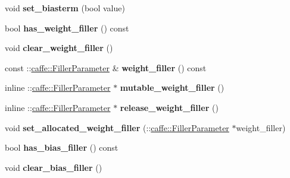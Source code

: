 \begin{DoxyCompactItemize}
void {\bfseries set\+\_\+biasterm} (bool value)
\item 
\mbox{\label{classcaffe_1_1_v0_layer_parameter_a8ea00d416e5208f8674954ca24645034}} 
bool {\bfseries has\+\_\+weight\+\_\+filler} () const
\item 
\mbox{\label{classcaffe_1_1_v0_layer_parameter_a70b689cbd8049c4d2cd89a0199e9e92b}} 
void {\bfseries clear\+\_\+weight\+\_\+filler} ()
\item 
\mbox{\label{classcaffe_1_1_v0_layer_parameter_aabc6c69238770f1ba8301add36dacda4}} 
const \+::\mbox{\hyperlink{classcaffe_1_1_filler_parameter}{caffe\+::\+Filler\+Parameter}} \& {\bfseries weight\+\_\+filler} () const
\item 
\mbox{\label{classcaffe_1_1_v0_layer_parameter_a27973929c368ae51d74019d537db47e3}} 
inline \+::\mbox{\hyperlink{classcaffe_1_1_filler_parameter}{caffe\+::\+Filler\+Parameter}} $\ast$ {\bfseries mutable\+\_\+weight\+\_\+filler} ()
\item 
\mbox{\label{classcaffe_1_1_v0_layer_parameter_a0683811531aac9a905cf8968b5aa9b81}} 
inline \+::\mbox{\hyperlink{classcaffe_1_1_filler_parameter}{caffe\+::\+Filler\+Parameter}} $\ast$ {\bfseries release\+\_\+weight\+\_\+filler} ()
\item 
\mbox{\label{classcaffe_1_1_v0_layer_parameter_ab747ac0d25ddb2cd3ad19f77ef1f2b7d}} 
void {\bfseries set\+\_\+allocated\+\_\+weight\+\_\+filler} (\+::\mbox{\hyperlink{classcaffe_1_1_filler_parameter}{caffe\+::\+Filler\+Parameter}} $\ast$weight\+\_\+filler)
\item 
\mbox{\label{classcaffe_1_1_v0_layer_parameter_a96f01bf572266a73dd3444130394038c}} 
bool {\bfseries has\+\_\+bias\+\_\+filler} () const
\item 
\mbox{\label{classcaffe_1_1_v0_layer_parameter_aa1bdd435aa8e213bacf9475d2c0c0dd5}} 
void {\bfseries clear\+\_\+bias\+\_\+filler} ()
\item 
\mbox{\label{classcaffe_1_1_v0_layer_parameter_a4892b9d81573f93efb529b36822a31f8}} 

\end{DoxyCompactItemize}
